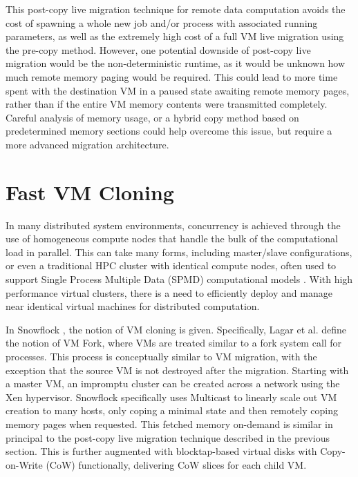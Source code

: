 This post-copy live migration technique for remote data computation avoids the cost of spawning a whole new job and/or process with associated running parameters, as well as the extremely high cost of a full VM live migration using the pre-copy method. However, one potential downside of post-copy live migration would be the non-deterministic runtime, as it would be unknown how much remote memory paging would be required. This could lead to more time spent with the destination VM in a paused state awaiting remote memory pages, rather than if the entire VM memory contents were transmitted completely. Careful analysis of memory usage, or a hybrid copy method based on predetermined memory sections could help overcome this issue, but require a more advanced migration architecture. 






\section{Fast VM Cloning}
\label{vmcloning}

In many distributed system environments, concurrency is achieved through the use of homogeneous compute nodes that handle the bulk of the computational load in parallel. This can take many forms, including master/slave configurations, or even a traditional HPC cluster with identical compute nodes, often used to support Single Process Multiple Data (SPMD) computational models \cite{spmd1988}. With high performance virtual clusters, there is a need to efficiently deploy and manage near identical virtual machines for distributed computation. 

In Snowflock \cite{lagar2009snowflock, lagar2011snowflock}, the notion of VM cloning is given. Specifically, Lagar et al. define the notion of VM Fork, where VMs are treated similar to a fork\(\) system call for processes.   This process is conceptually similar to VM migration, with the exception that the source VM is not destroyed after the migration. Starting with a master VM, an impromptu cluster can be created across a network using the Xen hypervisor.  Snowflock specifically uses Multicast to linearly scale out VM creation to many hosts, only coping a minimal state and then remotely coping memory pages when requested.  This fetched memory on-demand is similar in principal to the post-copy live migration technique described in the previous section.  This is further augmented with blocktap-based virtual disks with Copy-on-Write (CoW) functionally, delivering CoW slices for each child VM. 

